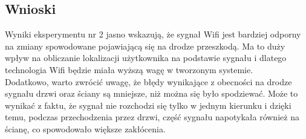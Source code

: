 \subsection{Wnioski}
Wyniki eksperymentu nr 2 jasno wskazują, że sygnał Wifi jest bardziej odporny na zmiany spowodowane pojawiającą się na drodze przeszkodą. Ma to duży wpływ na obliczanie lokalizacji użytkownika na podstawie sygnału i dlatego technologia Wifi będzie miała wyższą wagę w tworzonym systemie.\\
Dodatkowo, warto zwrócić uwagę, że błędy wynikające z obecności na drodze sygnału drzwi oraz ściany są mniejsze, niż można się było spodziewać. Może to wynikać z faktu, że sygnał nie rozchodzi się tylko w jednym kierunku i dzięki temu, podczas przechodzenia przez drzwi, część sygnału napotykała również na ścianę, co spowodowało większe zakłócenia.